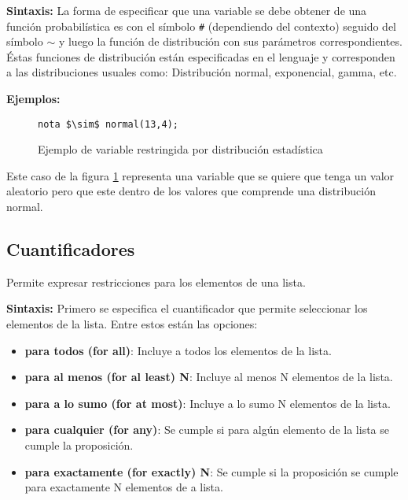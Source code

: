 \textbf{Sintaxis:} La forma de especificar que una variable se debe obtener de una función probabilística 
 es con el símbolo \texttt{\#} (dependiendo del contexto) seguido del símbolo \texttt{$\sim$} y 
luego la función de distribución con sus parámetros correspondientes. Éstas 
funciones de distribución están especificadas en el lenguaje y corresponden a 
las distribuciones usuales como: Distribución normal, exponencial, gamma, etc.
	
\textbf{Ejemplos:}
\begin{figure}[h]
\begin{lstlisting}[mathescape]
nota $\sim$ normal(13,4);
\end{lstlisting}
\caption[Ejemplo de variable restringida por distribución estadística]
{Ejemplo de variable restringida por distribución estadística}
\label{ejemplo_variable_dist_estadistica}
\end{figure}

Este caso de la figura \ref{ejemplo_variable_dist_estadistica} representa una 
variable que se quiere que tenga un valor aleatorio pero que este dentro de los 
valores que comprende una distribución normal.
\subsection{Cuantificadores}
Permite expresar restricciones para los elementos de una lista. 

\textbf{Sintaxis:} Primero se especifica el cuantificador que permite seleccionar 
los elementos de la lista. Entre estos están las opciones:
	
\begin{itemize}
 \item \textbf{para todos (for all)}: Incluye a todos los elementos de la lista.
 \item {\textbf{para al menos (for al least) N}: Incluye al menos N elementos de 
  la lista.}
 \item {\textbf{para a lo sumo (for at most)}: Incluye a lo sumo N elementos de 
  la lista.}
 \item {\textbf{para cualquier (for any)}: Se cumple si para algún elemento de 
  la lista se cumple la proposición.}
 \item {\textbf{para exactamente (for exactly) N}: Se cumple si la proposición 
  se cumple para exactamente N elementos de a lista.}	
\end{itemize}
	
